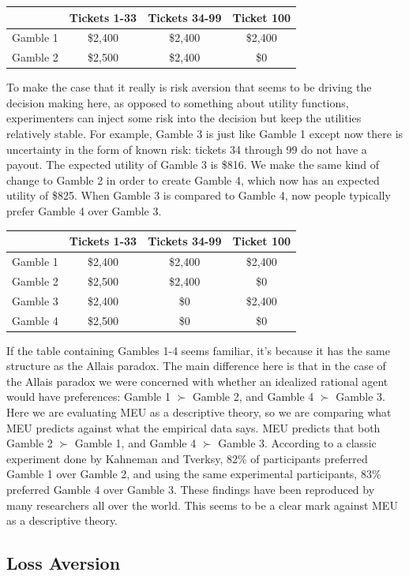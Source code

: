 \documentclass[]{tufte-book}
\begin{document}
\begin{longtable}[]{@{}lccc@{}}
\toprule
& Tickets 1-33 & Tickets 34-99 & Ticket 100\tabularnewline
\midrule
\endhead
Gamble 1 & \$2,400 & \$2,400 & \$2,400\tabularnewline
Gamble 2 & \$2,500 & \$2,400 & \$0\tabularnewline
\bottomrule
\end{longtable}

To make the case that it really is risk aversion that seems to be driving the decision making here, as opposed to something about utility functions, experimenters can inject some risk into the decision but keep the utilities relatively stable. For example, Gamble 3 is just like Gamble 1 except now there is uncertainty in the form of known risk: tickets 34 through 99 do not have a payout. The expected utility of Gamble 3 is \$816. We make the same kind of change to Gamble 2 in order to create Gamble 4, which now has an expected utility of \$825. When Gamble 3 is compared to Gamble 4, now people typically prefer Gamble 4 over Gamble 3.

\begin{longtable}[]{@{}lccc@{}}
\toprule
& Tickets 1-33 & Tickets 34-99 & Ticket 100\tabularnewline
\midrule
\endhead
Gamble 1 & \$2,400 & \$2,400 & \$2,400\tabularnewline
Gamble 2 & \$2,500 & \$2,400 & \$0\tabularnewline
Gamble 3 & \$2,400 & \$0 & \$2,400\tabularnewline
Gamble 4 & \$2,500 & \$0 & \$0\tabularnewline
\bottomrule
\end{longtable}

If the table containing Gambles 1-4 seems familiar, it's because it has the same structure as the Allais paradox. The main difference here is that in the case of the Allais paradox we were concerned with whether an idealized rational agent would have preferences: Gamble 1 \(\succ\) Gamble 2, and Gamble 4 \(\succ\) Gamble 3. Here we are evaluating MEU as a descriptive theory, so we are comparing what MEU predicts against what the empirical data says. MEU predicts that both Gamble 2 \(\succ\) Gamble 1, and Gamble 4 \(\succ\) Gamble 3. According to a classic experiment done by Kahneman and Tverksy, 82\% of participants preferred Gamble 1 over Gamble 2, and using the same experimental participants, 83\% preferred Gamble 4 over Gamble 3. These findings have been reproduced by many researchers all over the world. This seems to be a clear mark against MEU as a descriptive theory.

\hypertarget{loss-aversion}{%
\subsection{Loss Aversion}\label{loss-aversion}}
\end{document}
